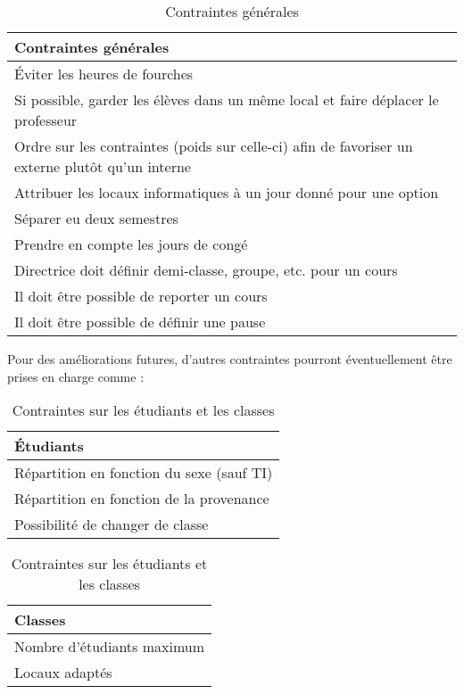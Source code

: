 \newpage

\begin{table}[!h]
\begin{center}
\begin{tabular}{|p{\linewidth}|}
\hline 
\textbf{Contraintes générales}\\
\hline
\hline
Éviter les heures de fourches\\
\hline
Si possible, garder les élèves dans un même local et faire déplacer le professeur\\
\hline
Ordre sur les contraintes (poids sur celle-ci) afin de favoriser un externe plutôt qu'un interne\\
\hline
Attribuer les locaux informatiques à un jour donné pour une option\\
\hline
Séparer eu deux semestres\\
\hline
Prendre en compte les jours de congé\\
\hline
Directrice doit définir demi-classe, groupe, etc. pour un cours\\
\hline
Il doit être possible de reporter un cours\\
\hline
Il doit être possible de définir une pause\\
\hline
\end{tabular}
\end{center}
\caption{Contraintes générales}
\end{table}
\bigskip


Pour des améliorations futures, d'autres contraintes pourront éventuellement être prises en charge comme :\\

\begin{table}[h!]
\begin{minipage}[t]{.3\linewidth}
\begin{tabular}{|l|}
\hline 
\textbf{Étudiants}\\
\hline
\hline
Répartition en fonction du sexe (sauf TI)\\
\hline
Répartition en fonction de la provenance\\
\hline
Possibilité de changer de classe\\
\hline
\end{tabular}
\end{minipage}
\hfill
\begin{minipage}[t]{.4\linewidth}
\begin{tabular}{|l|}
\hline 
\textbf{Classes}\\
\hline
\hline
Nombre d'étudiants maximum\\
\hline
Locaux adaptés\\
\hline
\end{tabular}
\end{minipage}

\caption{Contraintes sur les étudiants et les classes}
\label{etudiant_classes}
\end{table}
\bigskip



